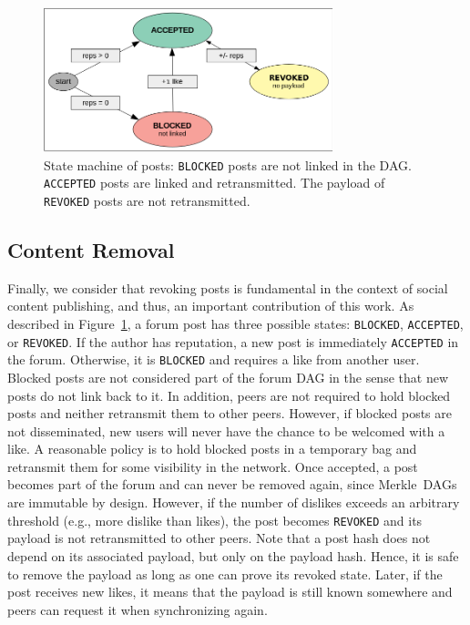 \documentclass[12pt]{article}
\newcommand{\code}[1]  {\texttt{\footnotesize{#1}}}
\begin{document}
\begin{figure}
\centering
\includegraphics[width=0.75\textwidth]{state-revoked.png}
\caption{
    State machine of posts:
    \code{BLOCKED} posts are not linked in the DAG.
    \code{ACCEPTED} posts are linked and retransmitted.
    The payload of \code{REVOKED} posts are not retransmitted.
}
\label{fig.state}
\end{figure}

\subsection{Content Removal}

Finally, we consider that revoking posts is fundamental in the context of
social content publishing, and thus, an important contribution of this work.
As described in Figure~\ref{fig.state}, a forum post has three possible states:
\code{BLOCKED}, \code{ACCEPTED}, or \code{REVOKED}.
%
If the author has reputation, a new post is immediately \code{ACCEPTED} in the
forum.
%
Otherwise, it is \code{BLOCKED} and requires a like from another user.
Blocked posts are not considered part of the forum DAG in the sense that new
posts do not link back to it.
In addition, peers are not required to hold blocked posts and neither
retransmit them to other peers.
However, if blocked posts are not disseminated, new users will never have the
chance to be welcomed with a like.
A reasonable policy is to hold blocked posts in a temporary bag and retransmit
them for some visibility in the network.
%
Once accepted, a post becomes part of the forum and can never be removed
again, since Merkle~DAGs are immutable by design.
%
However, if the number of dislikes exceeds an arbitrary threshold (e.g., more
dislike than likes), the post becomes \code{REVOKED} and its payload is not
retransmitted to other peers.
Note that a post hash does not depend on its associated payload, but only on
the payload hash.
Hence, it is safe to remove the payload as long as one can prove its revoked
state.
Later, if the post receives new likes, it means that the payload is still known
somewhere and peers can request it when synchronizing again.
\end{document}
